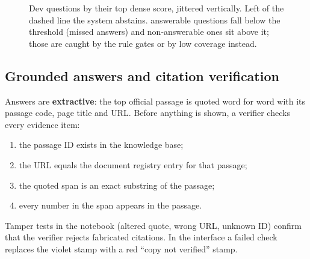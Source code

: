 \documentclass[11pt,a4paper]{article}
\def\addplotcoords#1#2{\expandafter\addplotcoordsi\expandafter{#2}{#1}}
\def\addplotcoordsi#1#2{\addplot[#2] coordinates {#1};}
\begin{document}
\begin{figure}[H]
\centering
{}
\caption{Dev questions by their top dense score, jittered vertically. Left of the dashed line the system abstains. \ThrAnsBelow{}
answerable questions fall below the threshold (missed answers) and \ThrNegAbove{} non-answerable ones sit above it; those are
caught by the rule gates or by low coverage instead.}
\label{fig:threshold}
\end{figure}

\subsection{Grounded answers and citation verification}
\label{sec:answer}
Answers are \textbf{extractive}: the top official passage is quoted word for word with its passage code, page title and URL.
Before anything is shown, a verifier checks every evidence item:
\begin{enumerate}[label=(\alph*)]
  \item the passage ID exists in the knowledge base;
  \item the URL equals the document registry entry for that passage;
  \item the quoted span is an exact substring of the passage;
  \item every number in the span appears in the passage.
\end{enumerate}
Tamper tests in the notebook (altered quote, wrong URL, unknown ID) confirm that the verifier rejects fabricated citations.
In the interface a failed check replaces the violet stamp with a red ``copy not verified'' stamp.
\end{document}
